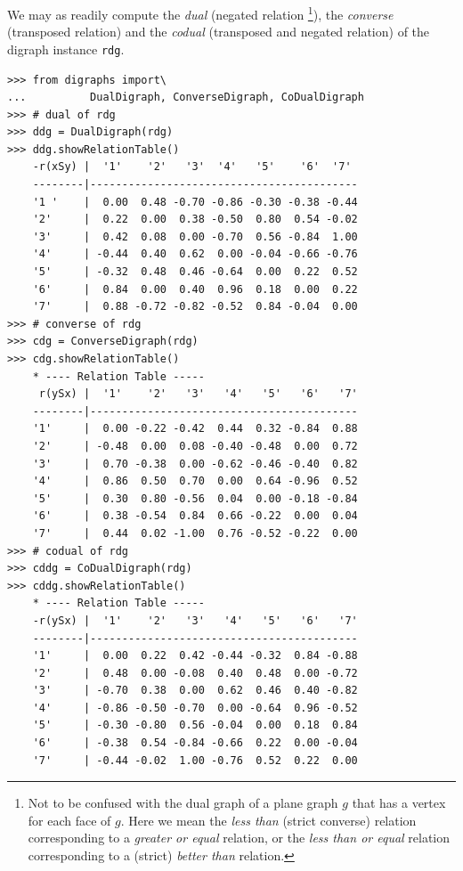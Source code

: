 We may as readily compute the \emph{dual} (negated relation \footnote{Not to be confused with the dual graph of a plane graph $g$ that has a vertex for each face of $g$. Here we mean the \emph{less than} (strict converse) relation corresponding to a \emph{greater or equal} relation, or the \emph{less than or equal} relation corresponding to a (strict) \emph{better than} relation.}), the \emph{converse} (transposed relation) and the \emph{codual} (transposed and negated relation) of the digraph instance \texttt{rdg}. 
\begin{lstlisting}[caption={Computing associated dual, converse and codual digraphs},label=list:2.7]
>>> from digraphs import\
...          DualDigraph, ConverseDigraph, CoDualDigraph
>>> # dual of rdg
>>> ddg = DualDigraph(rdg)
>>> ddg.showRelationTable()
    -r(xSy) |  '1'    '2'   '3'  '4'   '5'    '6'  '7'	  
    --------|------------------------------------------
    '1 '    |  0.00  0.48 -0.70 -0.86 -0.30 -0.38 -0.44	 
    '2'     |  0.22  0.00  0.38 -0.50  0.80  0.54 -0.02	 
    '3'     |  0.42  0.08  0.00 -0.70  0.56 -0.84  1.00	 
    '4'     | -0.44  0.40  0.62  0.00 -0.04 -0.66 -0.76	 
    '5'     | -0.32  0.48  0.46 -0.64  0.00  0.22  0.52	 
    '6'     |  0.84  0.00  0.40  0.96  0.18  0.00  0.22	 
    '7'     |  0.88 -0.72 -0.82 -0.52  0.84 -0.04  0.00
>>> # converse of rdg
>>> cdg = ConverseDigraph(rdg)
>>> cdg.showRelationTable()
    * ---- Relation Table -----
     r(ySx) |  '1'    '2'   '3'   '4'   '5'   '6'   '7'	  
    --------|------------------------------------------
    '1'     |  0.00 -0.22 -0.42  0.44  0.32 -0.84  0.88	 
    '2'     | -0.48  0.00  0.08 -0.40 -0.48  0.00  0.72	 
    '3'     |  0.70 -0.38  0.00 -0.62 -0.46 -0.40  0.82	 
    '4'     |  0.86  0.50  0.70  0.00  0.64 -0.96  0.52	 
    '5'     |  0.30  0.80 -0.56  0.04  0.00 -0.18 -0.84	 
    '6'     |  0.38 -0.54  0.84  0.66 -0.22  0.00  0.04	 
    '7'     |  0.44  0.02 -1.00  0.76 -0.52 -0.22  0.00	 
>>> # codual of rdg
>>> cddg = CoDualDigraph(rdg)
>>> cddg.showRelationTable()
    * ---- Relation Table -----
    -r(ySx) |  '1'    '2'   '3'   '4'   '5'   '6'   '7'	    
    --------|------------------------------------------
    '1'     |  0.00  0.22  0.42 -0.44 -0.32  0.84 -0.88	 
    '2'     |  0.48  0.00 -0.08  0.40  0.48  0.00 -0.72	 
    '3'     | -0.70  0.38  0.00  0.62  0.46  0.40 -0.82	 
    '4'     | -0.86 -0.50 -0.70  0.00 -0.64  0.96 -0.52	 
    '5'     | -0.30 -0.80  0.56 -0.04  0.00  0.18  0.84	 
    '6'     | -0.38  0.54 -0.84 -0.66  0.22  0.00 -0.04	 
    '7'     | -0.44 -0.02  1.00 -0.76  0.52  0.22  0.00	 
\end{lstlisting}

